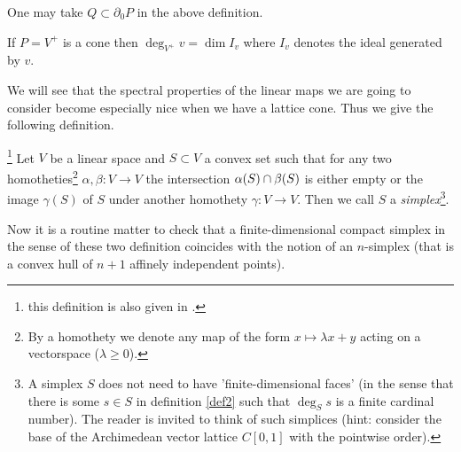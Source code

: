 \documentclass{article}
\begin{document}
\begin{remark}\label{rem2}
One may take $Q\subset\partial_0 P$ in the above definition.
\end{remark}

\begin{remark}
If $P=V^+$ is a cone then $\deg_{V^+}{v}=\dim I_v$ where $I_v$ denotes the ideal generated by $v$.   
\end{remark}

We will see that the spectral properties of the linear maps we are going to consider become especially nice when we have a lattice cone. Thus we give the following definition.

\begin{definition}[simplex]\label{def3}\footnote{this definition is also given in \cite{PerOrdTopVec}.}
Let $V$ be a linear space and $S\subset V$ a convex set such that for any two homotheties\footnote{By a homothety we denote any map of the form $x\mapsto \lambda x+y$ acting on a vectorspace ($\lambda\geq 0$).} $\alpha, \beta:V\to V$ the intersection $\alpha(S)\cap\beta(S)$ is either empty or the image $\gamma(S)$ of $S$ under another homothety $\gamma:V\to V$. Then we call $S$ a \emph{simplex}\footnote{A simplex $S$ does not need to have 'finite-dimensional faces' (in the sense that there is some $s\in S$ in definition \ref{def2} such that $\deg_S{s}$ is a finite cardinal number). The reader is invited to think of such simplices (hint: consider the base of the Archimedean vector lattice $C[0,1]$ with the pointwise order).}.
\end{definition}

%

Now it is a routine matter to check that a finite-dimensional compact simplex in the sense of these two definition coincides with the notion of an $n$-simplex (that is a convex hull of $n+1$ affinely independent points).
\end{document}
